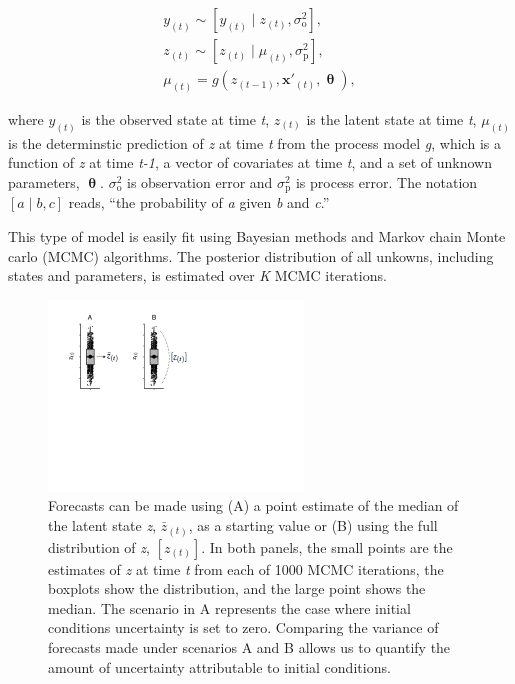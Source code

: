 \documentclass[12pt,]{article}
\begin{document}
\begin{gather}
y_{(t)} \sim \left[y_{(t)} \;|\; z_{(t)}, \sigma^2_{\text{o}}\right], \\
z_{(t)} \sim \left[z_{(t)} \;|\; \mu_{(t)}, \sigma^2_{\text{p}}\right], \\
\mu_{(t)} = g \left(z_{(t-1)},\textbf{x}'_{(t)}, \bm{\uptheta} \right),
\end{gather}

\noindent{}where \(y_{(t)}\) is the observed state at time \emph{t},
\(z_{(t)}\) is the latent state at time \emph{t}, \(\mu_{(t)}\) is the
determinstic prediction of \emph{z} at time \emph{t} from the process
model \emph{g}, which is a function of \emph{z} at time \emph{t-1}, a
vector of covariates at time \emph{t}, and a set of unknown parameters,
\(\bm{\uptheta}\). \(\sigma^2_{\text{o}}\) is observation error and
\(\sigma^2_{\text{p}}\) is process error. The notation
\(\left[a \;|\; b, c\right]\) reads, ``the probability of \emph{a} given
\emph{b} and \emph{c}.''

This type of model is easily fit using Bayesian methods and Markov chain
Monte carlo (MCMC) algorithms. The posterior distribution of all
unkowns, including states and parameters, is estimated over \emph{K}
MCMC iterations.

\begin{figure}
\centering
\includegraphics[height=2.00000in]{../figures/init_cond_example.pdf}
\caption{Forecasts can be made using (A) a point estimate of the median
of the latent state \emph{z}, \(\bar{z}_{(t)}\), as a starting value or
(B) using the full distribution of \emph{z}, \([z_{(t)}]\). In both
panels, the small points are the estimates of \emph{z} at time \emph{t}
from each of 1000 MCMC iterations, the boxplots show the distribution,
and the large point shows the median. The scenario in A represents the
case where initial conditions uncertainty is set to zero. Comparing the
variance of forecasts made under scenarios A and B allows us to quantify
the amount of uncertainty attributable to initial conditions.}
\end{figure}
\end{document}
